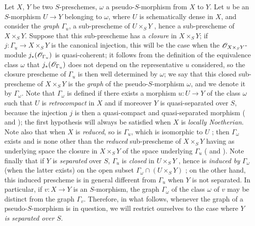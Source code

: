\begin{env}[20.4.1]\label{IV.20.4.1}
Let $X$, $Y$ be two $S$-preschemes, $\omega$ a pseudo-$S$-morphism from $X$ to $Y$.
Let $u$ be an $S$-morphism $U\to Y$ belonging to $\omega$, where $U$ is schematically dense in $X$, and consider the \emph{graph} $\Gamma_u$, a sub-prescheme of $U\times_S Y$ , hence a sub-prescheme of $X\times_S Y$.
Suppose that this sub-prescheme has a \emph{closure}  in $X\times_S Y$; if $j:\Gamma_u\to X\times_S Y$ is the canonical injection, this will be the case when the $\mathscr{O}_{X\times_S Y}$-module $j_*(\mathscr{O}_{\Gamma_u})$ is quasi-coherent; it follows from the definition of the equivalence class $\omega$  that $j_*(\mathscr{O}_{\Gamma_u})$ does not depend on the representative $u$ considered, so the closure prescheme of $\Gamma_u$ is then well determined by $\omega$; we say that this closed sub-prescheme of $X\times_S Y$ is the \emph{graph} of the pseudo-$S$-morphism $\omega$, and we denote it by $\Gamma_\omega$.
Note that $\Gamma_\omega$ is defined if there exists a morphism $u:U\to Y$ of the class $\omega$ such that $U$ is \emph{retrocompact} in $X$ and if moreover $Y$ is quasi-separated over $S$, because the injection $j$ is then a quasi-compact and quasi-separated morphism ( and ); the first hypothesis will always be satisfied when $X$ is \emph{locally Noetherian}.
Note also that when $X$ is \emph{reduced}, so is $\Gamma_u$, which is isomorphic to $U$ ; then $\Gamma_\omega$ exists and is none other than the \emph{reduced} sub-prescheme of $X\times_S Y$ having as underlying space the closure in $X\times_S Y$ of the space underlying $\Gamma_u$ ( and ).
Note finally that if $Y$ is \emph{separated} over $S$, $\Gamma_u$ is \emph{closed} in $U\times_S Y$ , hence is \emph{induced by} $\Gamma_\omega$ (when the latter exists) on the open subset $\Gamma_\omega\cap(U\times_S Y)$ ; on the other hand, this induced prescheme is in general different from $\Gamma_u$ when $Y$ is not separated.
In particular, if $v:X\to Y$ is an $S$-morphism, the graph $\Gamma_\omega$ of the class $\omega$ of $v$ may be distinct from the graph $\Gamma_v$.
Therefore, in what follows, whenever the graph of a pseudo-$S$-morphism is in question, we will restrict ourselves to the case where \emph{$Y$ is separated over $S$}.
\end{env}

